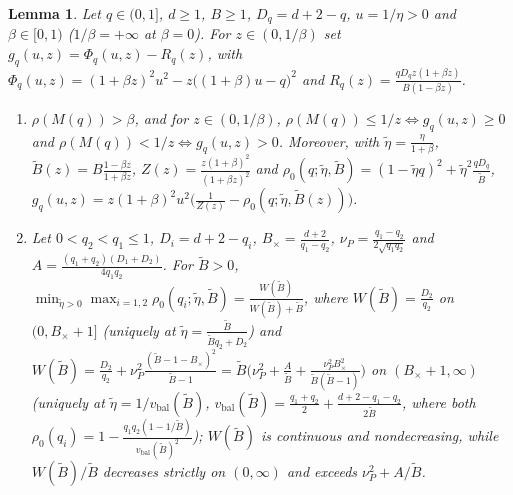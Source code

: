 \documentclass[11pt]{article}
\newtheorem{lemma}[theorem]{Lemma}
\begin{document}
\begin{lemma}\label{lem:gq}
Let $q\in(0,1]$, $d\ge1$, $B\ge1$, $D_q=d+2-q$, $u=1/\eta>0$ and $\beta\in[0,1)$ ($1/\beta=+\infty$ at $\beta=0$). For $z\in(0,1/\beta)$ set $g_q(u,z)=\Phi_q(u,z)-R_q(z)$, with $\Phi_q(u,z)=(1+\beta z)^2u^2-z\big((1+\beta)u-q\big)^2$ and $R_q(z)=\frac{qD_qz(1+\beta z)}{B(1-\beta z)}$.
\begin{enumerate}
\item[(i)] $\rho(M(q))>\beta$, and for $z\in(0,1/\beta)$, $\rho(M(q))\le1/z\iff g_q(u,z)\ge0$ and $\rho(M(q))<1/z\iff g_q(u,z)>0$. Moreover, with $\tilde\eta=\frac{\eta}{1+\beta}$, $\tilde B(z)=B\frac{1-\beta z}{1+\beta z}$, $Z(z)=\frac{z(1+\beta)^2}{(1+\beta z)^2}$ and $\rho_0(q;\tilde\eta,\tilde B)=(1-\tilde\eta q)^2+\tilde\eta^2\frac{qD_q}{\tilde B}$, $g_q(u,z)=z(1+\beta)^2u^2\big(\frac1{Z(z)}-\rho_0(q;\tilde\eta,\tilde B(z))\big)$.
\item[(ii)] Let $0<q_2<q_1\le1$, $D_i=d+2-q_i$, $B_\times=\frac{d+2}{q_1-q_2}$, $\nu_P=\frac{q_1-q_2}{2\sqrt{q_1q_2}}$ and $A=\frac{(q_1+q_2)(D_1+D_2)}{4q_1q_2}$. For $\tilde B>0$, $\min_{\tilde\eta>0}\max_{i=1,2}\rho_0(q_i;\tilde\eta,\tilde B)=\frac{W(\tilde B)}{W(\tilde B)+\tilde B}$, where $W(\tilde B)=\frac{D_2}{q_2}$ on $(0,B_\times+1]$ (uniquely at $\tilde\eta=\frac{\tilde B}{\tilde Bq_2+D_2}$) and $W(\tilde B)=\frac{D_2}{q_2}+\nu_P^2\frac{(\tilde B-1-B_\times)^2}{\tilde B-1}=\tilde B\big(\nu_P^2+\frac A{\tilde B}+\frac{\nu_P^2B_\times^2}{\tilde B(\tilde B-1)}\big)$ on $(B_\times+1,\infty)$ (uniquely at $\tilde\eta=1/v_{\mathrm{bal}}(\tilde B)$, $v_{\mathrm{bal}}(\tilde B)=\frac{q_1+q_2}2+\frac{d+2-q_1-q_2}{2\tilde B}$, where both $\rho_0(q_i)=1-\frac{q_1q_2(1-1/\tilde B)}{v_{\mathrm{bal}}(\tilde B)^2}$); $W(\tilde B)$ is continuous and nondecreasing, while $W(\tilde B)/\tilde B$ decreases strictly on $(0,\infty)$ and exceeds $\nu_P^2+A/\tilde B$.
\end{enumerate}
\end{lemma}
\end{document}

